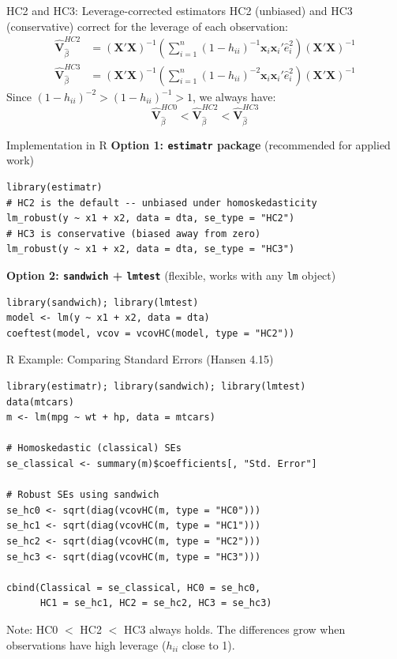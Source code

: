 \documentclass[aspectratio=169, handout, t]{beamer}
\numberwithin{equation}{section}
\begin{document}
\begin{frame}{HC2 and HC3: Leverage-corrected estimators}
HC2 (unbiased) and HC3 (conservative) correct for the leverage of each observation:
\begin{align*}
\hat{\bm{V}}^{HC2}_{\hat{\beta}}&=(\bm{X'X})^{-1}\!\left(\sum_{i=1}^n (1-h_{ii})^{-1} \bm{x}_i\bm{x}_i'\hat{e}_i^2\right)\!(\bm{X'X})^{-1}\\[4pt]
\hat{\bm{V}}^{HC3}_{\hat{\beta}}&=(\bm{X'X})^{-1}\!\left(\sum_{i=1}^n (1-h_{ii})^{-2}\bm{x}_i\bm{x}_i'\hat{e}_i^2\right)\!(\bm{X'X})^{-1}
\end{align*}
\medskip
Since $(1-h_{ii})^{-2}>(1-h_{ii})^{-1}>1$, we always have:
$$\hat{\bm{V}}^{HC0}_{\hat{\beta}}< \hat{\bm{V}}^{HC2}_{\hat{\beta}}< \hat{\bm{V}}^{HC3}_{\hat{\beta}}$$
\end{frame}


\begin{frame}[fragile]{Implementation in R}
\textbf{Option 1: \texttt{estimatr} package} (recommended for applied work)
\begin{lstlisting}
library(estimatr)
# HC2 is the default -- unbiased under homoskedasticity
lm_robust(y ~ x1 + x2, data = dta, se_type = "HC2")
# HC3 is conservative (biased away from zero)
lm_robust(y ~ x1 + x2, data = dta, se_type = "HC3")
\end{lstlisting}\pause
\textbf{Option 2: \texttt{sandwich} + \texttt{lmtest}} (flexible, works with any \texttt{lm} object)
\begin{lstlisting}
library(sandwich); library(lmtest)
model <- lm(y ~ x1 + x2, data = dta)
coeftest(model, vcov = vcovHC(model, type = "HC2"))
\end{lstlisting}
\end{frame}

\begin{frame}[fragile]{R Example: Comparing Standard Errors (Hansen 4.15)}
\begin{lstlisting}
library(estimatr); library(sandwich); library(lmtest)
data(mtcars)
m <- lm(mpg ~ wt + hp, data = mtcars)

# Homoskedastic (classical) SEs
se_classical <- summary(m)$coefficients[, "Std. Error"]

# Robust SEs using sandwich
se_hc0 <- sqrt(diag(vcovHC(m, type = "HC0")))
se_hc1 <- sqrt(diag(vcovHC(m, type = "HC1")))
se_hc2 <- sqrt(diag(vcovHC(m, type = "HC2")))
se_hc3 <- sqrt(diag(vcovHC(m, type = "HC3")))

cbind(Classical = se_classical, HC0 = se_hc0,
      HC1 = se_hc1, HC2 = se_hc2, HC3 = se_hc3)
\end{lstlisting}
\medskip
Note: HC0 $<$ HC2 $<$ HC3 always holds.  The differences grow when observations have high leverage ($h_{ii}$ close to 1).
\end{frame}
\end{document}
